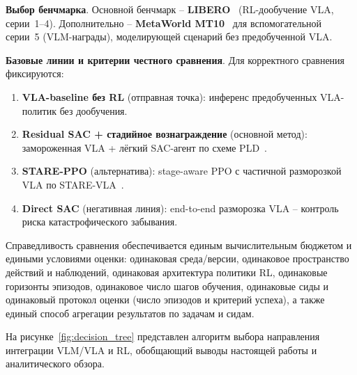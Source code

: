     \textbf{Выбор бенчмарка}. Основной бенчмарк -- \textbf{LIBERO}~\cite{liu2023libero} (RL-дообучение VLA, серии~1--4). Дополнительно -- \textbf{MetaWorld MT10}~\cite{yu2020metaworld} для вспомогательной серии~5 (VLM-награды), моделирующей сценарий без предобученной VLA.

    \textbf{Базовые линии и критерии честного сравнения}. Для корректного сравнения фиксируются:
    \begin{enumerate}
        \item \textbf{VLA-baseline без RL} (отправная точка): инференс предобученных VLA-политик без дообучения.
        \item \textbf{Residual SAC + стадийное вознаграждение} (основной метод): замороженная VLA + лёгкий SAC-агент по схеме PLD~\cite{pld2026}.
        \item \textbf{STARE-PPO} (альтернатива): stage-aware PPO с частичной разморозкой VLA по STARE-VLA~\cite{starevla2025}.
        \item \textbf{Direct SAC} (негативная линия): end-to-end разморозка VLA -- контроль риска катастрофического забывания.
    \end{enumerate}

    Справедливость сравнения обеспечивается единым вычислительным бюджетом и едиными условиями оценки: одинаковая среда/версии, одинаковое пространство действий и наблюдений, одинаковая архитектура политики RL, одинаковые горизонты эпизодов, одинаковое число шагов обучения, одинаковые сиды и одинаковый протокол оценки (число эпизодов и критерий успеха), а также единый способ агрегации результатов по задачам и сидам.

    На рисунке~\ref{fig:decision_tree} представлен алгоритм выбора направления интеграции VLM/VLA и RL, обобщающий выводы настоящей работы и аналитического обзора.

